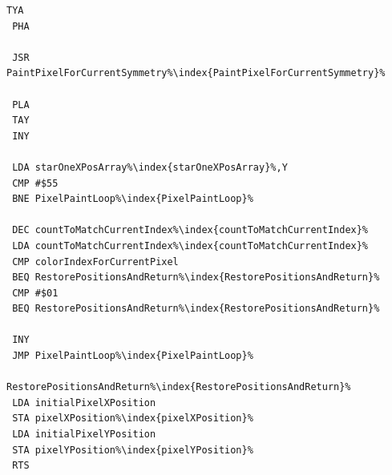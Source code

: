 \begin{minipage}[b]{0.33\linewidth}
\begin{lrbox}{\mybox}
\begin{lstlisting}[basicstyle=\ttfamily\tiny,escapechar=\%]
 TYA 
 PHA 

 JSR PaintPixelForCurrentSymmetry%\index{PaintPixelForCurrentSymmetry}%

 PLA 
 TAY 
 INY 

 LDA starOneXPosArray%\index{starOneXPosArray}%,Y
 CMP #$55
 BNE PixelPaintLoop%\index{PixelPaintLoop}%

 DEC countToMatchCurrentIndex%\index{countToMatchCurrentIndex}%
 LDA countToMatchCurrentIndex%\index{countToMatchCurrentIndex}%
 CMP colorIndexForCurrentPixel
 BEQ RestorePositionsAndReturn%\index{RestorePositionsAndReturn}%
 CMP #$01
 BEQ RestorePositionsAndReturn%\index{RestorePositionsAndReturn}%

 INY 
 JMP PixelPaintLoop%\index{PixelPaintLoop}%

RestorePositionsAndReturn%\index{RestorePositionsAndReturn}%   
 LDA initialPixelXPosition
 STA pixelXPosition%\index{pixelXPosition}%
 LDA initialPixelYPosition
 STA pixelYPosition%\index{pixelYPosition}%
 RTS 
\end{lstlisting}
\end{lrbox}%
\scalebox{0.8}{\usebox{\mybox}}
\end{minipage}
\hspace{-0.1cm}
